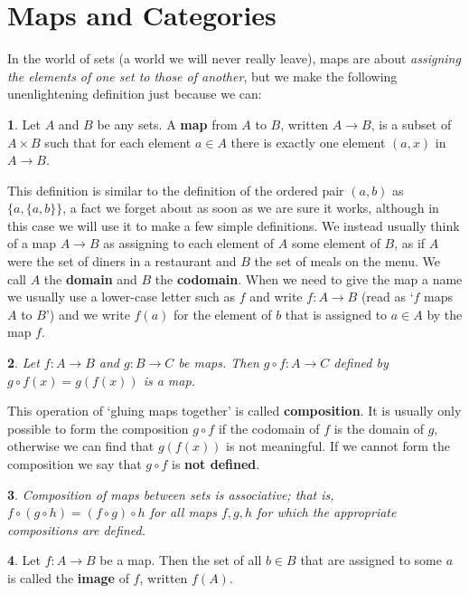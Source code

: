 \documentclass[oneside,english]{amsbook}
\numberwithin{section}{chapter}
\theoremstyle{plain}
\newtheorem{thm}{\protect\theoremname}
\theoremstyle{definition}
\newtheorem{defn}[thm]{\protect\definitionname}
\providecommand{\definitionname}{Definition}
\providecommand{\theoremname}{Theorem}
\begin{document}
\section{Maps and Categories}

In the world of sets (a world we will never really leave), maps are about \emph{assigning the elements of one set to those of another}, but we make the following unenlightening definition just because we can: 

\begin{defn} 
	Let $A$ and $B$ be any sets. A \textbf{map} from $A$ to $B$, written $A\to B$, is a subset of $A\times B$ such that for each element $a\in A$ there is exactly one element $(a,x)$ in $A\to B$. 
\end{defn} 

This definition is similar to the definition of the ordered pair $(a,b)$ as $\{a,\{a,b\}\}$, a fact we forget about as soon as we are sure it works, although in this case we will use it to make a few simple definitions. We instead usually think of a map $A\to B$ as assigning to each element of $A$ some element of $B$, as if $A$ were the set of diners in a restaurant and $B$ the set of meals on the menu. We call $A$ the \textbf{domain} and $B$ the \textbf{codomain}. When we need to give the map a name we usually use a lower-case letter such as $f$ and write $f:A\to B$ (read as `$f$ maps $A$ to $B$') and we write $f(a)$ for the element of $b$ that is assigned to $a\in A$ by the map $f$. 

\begin{thm} 
	Let $f:A\to B$ and $g:B\to C$ be maps. Then $g\circ f:A\to C$ defined by $g\circ f(x)=g(f(x))$ is a map. 
\end{thm} 

This operation of `gluing maps together' is called \textbf{composition}. It is usually only possible to form the composition $g\circ f$ if the codomain of $f$ is the domain of $g$, otherwise we can find that $g(f(x))$ is not meaningful. If we cannot form the composition we say that $g\circ f$ is \textbf{not defined}. 

\begin{thm} 
	Composition of maps between sets is associative; that is, $f\circ(g\circ h)=(f\circ g)\circ h$ for all maps $f,g,h$ for which the appropriate compositions are defined. 
\end{thm} 

\begin{defn} 
	Let $f:A\to B$ be a map. Then the set of all \textbf{$b\in B$ }that are assigned to some $a$ is called the \textbf{image} of $f$, written $f(A)$. 
\end{defn}
\end{document}
